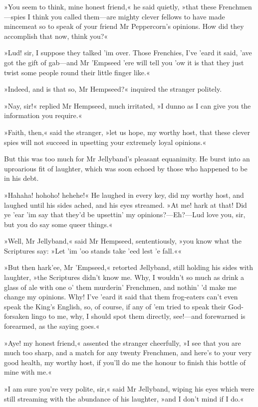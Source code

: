 »You seem to think, mine honest friend,« he said quietly, »that these Frenchmen—spies I think you called them—are mighty clever fellows to have made mincemeat so to speak of your friend Mr Peppercorn's opinions. How did they accomplish that now, think you?«

»Lud! sir, I suppose they talked 'im over. Those Frenchies, I've 'eard it said, 'ave got the gift of gab—and Mr 'Empseed 'ere will tell you 'ow it is that they just twist some people round their little finger like.«

»Indeed, and is that so, Mr Hempseed?« inquired the stranger politely.

»Nay, sir!« replied Mr Hempseed, much irritated, »I dunno as I can give you the information you require.«

»Faith, then,« said the stranger, »let us hope, my worthy host, that these clever spies will not succeed in upsetting your extremely loyal opinions.«

But this was too much for Mr Jellyband's pleasant equanimity. He burst into an uproarious fit of laughter, which was soon echoed by those who happened to be in his debt.

»Hahaha! hohoho! hehehe!« He laughed in every key, did my worthy host, and laughed until his sides ached, and his eyes streamed. »At me! hark at that! Did ye 'ear 'im say that they'd be upsettin' my opinions?—Eh?—Lud love you, sir, but you do say some queer things.«

»Well, Mr Jellyband,« said Mr Hempseed, sententiously, »you know what the Scriptures say: »Let 'im 'oo stands take 'eed lest 'e fall.««

»But then hark'ee, Mr 'Empseed,« retorted Jellyband, still holding his sides with laughter, »the Scriptures didn't know me. Why, I wouldn't so much as drink a glass of ale with one o' them murderin' Frenchmen, and nothin' 'd make me change my opinions. Why! I've 'eard it said that them frog-eaters can't even speak the King's English, so, of course, if any of 'em tried to speak their God-forsaken lingo to me, why, I should spot them directly, see!—and forewarned is forearmed, as the saying goes.«

»Aye! my honest friend,« assented the stranger cheerfully, »I see that you are much too sharp, and a match for any twenty Frenchmen, and here's to your very good health, my worthy host, if you'll do me the honour to finish this bottle of mine with me.«

»I am sure you're very polite, sir,« said Mr Jellyband, wiping his eyes which were still streaming with the abundance of his laughter, »and I don't mind if I do.«

